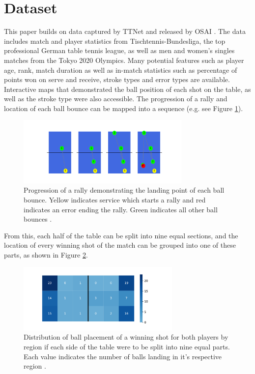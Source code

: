 \section{Dataset} \label{dataset}
This paper builds on data captured by TTNet \cite{voeikov2020ttnet} and released by OSAI \cite{OSAI}. The data includes match and player statistics from Tischtennis-Bundesliga, the top professional German table tennis league, as well as men and women's singles matches from the Tokyo 2020 Olympics. Many potential features such as player age, rank, match duration as well as in-match statistics such as percentage of points won on serve and receive, stroke types and error types are available. Interactive maps that demonstrated the ball position of each shot on the table, as well as the stroke type were also accessible. The progression of a rally and location of each ball bounce can be mapped into a sequence (e.g. see Figure \ref{sequence}).


\begin{figure}[ht]
\centering

\includegraphics[width=8.5cm]{plots/tablesequence.pdf}
\caption{Progression of a rally demonstrating the landing point of each ball bounce. Yellow indicates service which starts a rally and red indicates an error ending the rally. Green indicates all other ball bounces \cite{OSAI}.}

\label{sequence}
\end{figure}

From this, each half of the table can be split into nine equal sections, and the location of every winning shot of the match can be grouped into one of these parts, as shown in Figure \ref{pos}.

\begin{figure}[ht]
\centering

\includegraphics[width=8cm]{plots/tableheatmaprot.pdf}
\caption{Distribution of ball placement of a winning shot for both players by region if each side of the table were to be split into nine equal parts. Each value indicates the number of balls landing in it's respective region \cite{OSAI}.}

\label{pos}
\end{figure}

